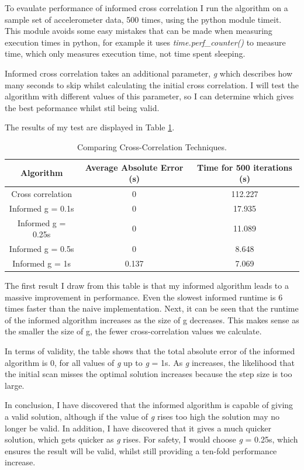 \documentclass[12pt,a4paper,twoside,openright]{report}
\begin{document}
To evaulate performance of informed cross correlation I run the
algorithm on a sample set of accelerometer data, 500 times, using the python
module timeit. This module avoids some easy mistakes that can be made when
measuring execution times in python, for example it uses
\emph{time.perf\_counter()} to measure time, which only measures execution
time, not time spent sleeping.

Informed cross correlation takes an additional parameter,
\emph{g} which describes how many seconds to skip whilst
calculating the initial cross correlation. I will test the algorithm with different
values of this parameter, so I can determine which gives the best peformance
whilst stil being valid. 

The results of my test are displayed in Table \ref{table:cross-correlation}. 

\begin{table}
\centering
\caption{Comparing Cross-Correlation Techniques.}
\label{table:cross-correlation}
\begin{tabular}{ | c | c | c | }
	\hline
	Algorithm & Average Absolute Error (s) & Time for 500
	iterations (s)\\ 
	\hline
	Cross correlation & 0 & 112.227 \\  
	Informed g = 0.1s & 0 & 17.935 \\    
	Informed g = 0.25s & 0 & 11.089 \\    
	Informed g = 0.5s & 0 & 8.648 \\    
	Informed g = 1s & 0.137 & 7.069  \\
	\hline
   \end{tabular}
\end{table}

The first result I draw from this table is that my informed algorithm leads to
a massive improvement in performance. Even the slowest informed runtime is 6
times faster than the naive implementation. Next, it can be seen that the
runtime of the informed algorithm increases as the size of g decreases. This
makes sense as the smaller the size of g, the fewer cross-correlation values
we calculate.

In terms of validity, the table shows that the total absolute error of the
informed algorithm is 0, for all values of \emph{g} up to \emph{g} = 1s. As
\emph{g} increases, the likelihood that the initial scan misses the optimal
solution increases because the step size is too large. 

In conclusion, I have discovered that the informed algorithm is capable of
giving a valid solution, although if the value of \emph{g} rises too high the
solution may no longer be valid. In addition, I have discovered that it gives
a much quicker solution, which gets quicker as \emph{g} rises. For safety, I
would choose \emph{g} = 0.25s, which ensures the result will be valid, whilst
still providing a ten-fold performance increase.
\end{document}
